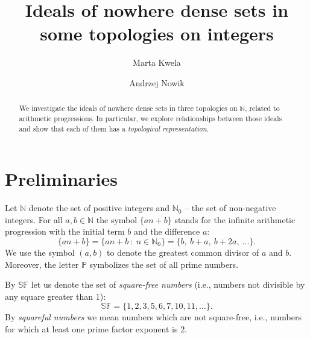 \documentclass{amsart}
\title[Ideals of nowhere dense sets in some topologies on integers]{Ideals of nowhere dense sets in some topologies on integers}
\author{Marta Kwela}
\author{Andrzej Nowik}
\theoremstyle{definition}
\theoremstyle{definition}
\newcommand{\N}{{\mathbb N}}
\newcommand{\SqrFr}{\mathbb{SF}}
\newcommand{\finbw}{\text{FinBW}}
\begin{document}
\begin{abstract}
We investigate the ideals of nowhere dense sets in three topologies on $\N$, related to arithmetic progressions. In particular, we explore relationships between those ideals and show that each of them has a \textit{topological representation}.
\end{abstract}
\maketitle






\section{Preliminaries}

Let $\N$ denote the set of positive integers and $\N_0$ -- the set of non-negative integers. For all $a,b\in\N$ the symbol $\{an+b\}$ stands for the infinite arithmetic progression with the initial term $b$ and the difference $a$:
$$\{an+b\} = \{an+b\ :\ n\in\N_0\} = \{b,\ b+a,\ b+2a,\ ...\}. $$
We use the symbol $(a,b)$ to denote the greatest common divisor of $a$ and $b$. Moreover, the letter $\mathbb{P}$ symbolizes the set of all prime numbers.

By $\mathbb{SF}$ let us denote the set of \emph{square-free numbers} (i.e., numbers not divisible by any square greater than 1):
$$\SqrFr = \{1,2,3,5,6,7,10,11,\ldots\}.$$
By \emph{squareful numbers} we mean numbers which are not square-free, i.e., numbers for which at least one prime factor exponent is 2.
\end{document}
